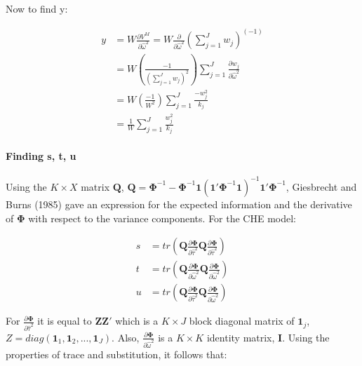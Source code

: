 Now to find y: 


\begin{equation}
    \begin{split}
        y & = W \frac{\partial V^M}{\partial \hat{\omega}^2} = W \frac{\partial}{\partial \hat{\omega}^2} \left( \sum_{j=1}^Jw_j\right)^{(-1)} \\
         & = W \left( \frac{-1}{ (\sum_{j=1}^J w_j)^2 } \right) \sum_{j=1}^J \frac{\partial w_j}{\partial \hat{\omega}^2} \\
         & = W \left( \frac{-1}{ W^2 } \right) \sum_{j=1}^J \frac{-w_j^2}{k_j} \\
         & = \frac{1}{W} \sum_{j=1}^J \frac{w_j^2}{k_j}
    \end{split}
    \nonumber
\end{equation}

\paragraph{Finding s, t, u}

Using the $K\times X$ matrix $\mathbf{Q}$,  $\mathbf{Q} = \mathbf{\Phi}^{-1}-\mathbf{\Phi}^{-1}\mathbf{1}(\mathbf{1}'\mathbf{\Phi}^{-1}\mathbf{1})^{-1}\mathbf{1}'\mathbf{\Phi}^{-1}$, Giesbrecht and Burns (1985) gave an expression for the expected information and the derivative of $\mathbf{\Phi}$ with respect to the variance components. For the CHE model: 

\begin{equation}
    \begin{split}
        s & = tr(\mathbf{Q} \frac{\partial \mathbf{\Phi}}{\partial \hat{\tau}^2}\mathbf{Q}\frac{\partial \mathbf{\Phi}}{\partial \hat{\tau}^2}) \\
        t & = tr(\mathbf{Q} \frac{\partial \mathbf{\Phi}}{\partial \hat{\omega}^2}\mathbf{Q}\frac{\partial \mathbf{\Phi}}{\partial \hat{\omega}^2}) \\
        u & = tr(\mathbf{Q} \frac{\partial \mathbf{\Phi}}{\partial \hat{\tau}^2}\mathbf{Q}\frac{\partial \mathbf{\Phi}}{\partial \hat{\omega}^2}) 
    \end{split}
\end{equation}

For $\frac{\partial \mathbf{\Phi}}{\partial \hat{\tau}^2}$ it is equal to $\mathbf{Z}\mathbf{Z}'$ which is a $K \times J$ block diagonal matrix of $\mathbf{1}_j$, $Z= diag(\mathbf{1}_1, \mathbf{1}_2, ..., \mathbf{1}_J)$. Also, $\frac{\partial \mathbf{\Phi}}{\partial \hat{\omega}^2}$ is a $K \times K$ identity matrix, $\mathbf{I}$. Using the properties of trace and substitution, it follows that:


